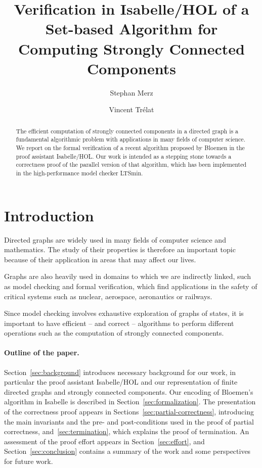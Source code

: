 \documentclass[sigplan,10pt,anonymous,review]{acmart}
\title{Verification in Isabelle/HOL of a Set-based Algorithm for Computing Strongly Connected Components}
\author{Stephan Merz}
\affiliation{
  \institution{University of Lorraine, CNRS, Inria, LORIA}
  \city{Nancy}
  \country{France}
}
\author{Vincent Trélat}
\affiliation{
  \institution{University of Lorraine}
  \city{Nancy}
  \country{France}
}
\begin{document}
\begin{abstract}
  The efficient computation of strongly connected components in a directed graph is a fundamental algorithmic problem with applications in many fields of computer science. We report on the formal verification of a recent algorithm proposed by Bloemen in the proof assistant Isabelle/HOL. Our work is intended as a stepping stone towards a correctness proof of the parallel version of that algorithm, which has been implemented in the high-performance model checker LTSmin.
\end{abstract}

\maketitle

\section{Introduction}
\label{sec:introduction}
Directed graphs are widely used in many fields of computer science and mathematics.
The study of their properties is therefore an important topic because of their application in areas that may affect our lives.

Graphs are also heavily used in domains to which we are indirectly linked, such as model checking and formal verification, which find applications in the safety of critical systems such as nuclear, aerospace, aeronautics or railways.

Since model checking involves exhaustive exploration of graphs of states, it is important to have efficient -- and correct -- algorithms to perform different operations such as the computation of strongly connected components.

\paragraph{Outline of the paper.}

Section~\ref{sec:background} introduces necessary background for our work, in particular the proof assistant Isabelle/HOL and our representation of finite directed graphs and strongly connected components. Our encoding of Bloemen's algorithm in Isabelle is described in Section~\ref{sec:formalization}. The presentation of the correctness proof appears in Sections~\ref{sec:partial-correctness}, introducing the main invariants and the pre- and post-conditions used in the proof of partial correctness, and~\ref{sec:termination}, which explains the proof of termination. An assessment of the proof effort appears in Section~\ref{sec:effort}, and Section~\ref{sec:conclusion} contains a summary of the work and some perspectives for future work.
\end{document}
